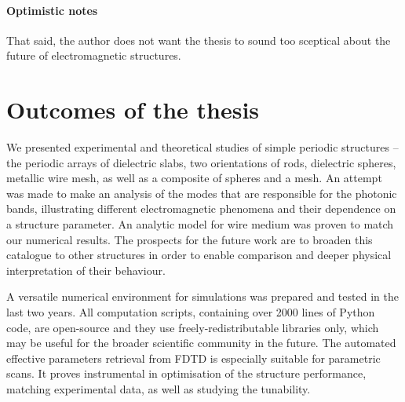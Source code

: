 \paragraph{Optimistic notes}
That said, the author does not want the thesis to sound too sceptical about the future of electromagnetic structures. 


\section{Outcomes of the thesis}
We presented experimental and theoretical studies of simple periodic structures -- the periodic arrays of dielectric slabs, two orientations of rods, dielectric spheres, metallic wire mesh, as well as a composite of spheres and a mesh. An attempt was made to make an analysis of the modes that are responsible for the photonic bands, illustrating different electromagnetic phenomena and their dependence on a structure parameter. An analytic model for wire medium was proven to match our numerical results.
The prospects for the future work are to broaden this catalogue to other structures in order to enable comparison and deeper physical interpretation of their behaviour. 

A versatile numerical environment for simulations was prepared and tested in the last two years. All computation scripts, containing over 2000 lines of Python code, are open-source and they use freely-redistributable libraries only, which may be useful for the broader scientific community in the future. 
The automated effective parameters retrieval from FDTD is especially suitable for parametric scans. It proves instrumental in optimisation of the structure performance, matching experimental data, as well as studying the tunability.


